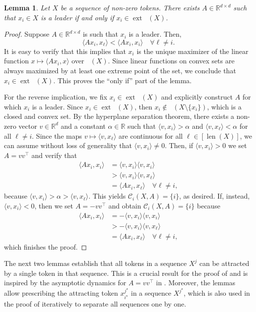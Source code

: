 \documentclass[pdflatex,sn-mathphys-num]{sn-jnl}%
\theoremstyle{thmstyleone}%
\newtheorem{lemma}[theorem]{Lemma}
\theoremstyle{thmstyletwo}%
\theoremstyle{thmstylethree}%
\numberwithin{equation}{section}
\newcommand{\R}{\mathbb{R}}
\DeclareMathOperator{\co}{\overline{co}}
\DeclareMathOperator{\ext}{ext}
\newcommand{\ip}[2]{\langle #1, #2 \rangle}
\DeclareMathOperator{\len}{len}
\begin{document}
\begin{lemma}\label{lem:howToLeader}
Let $X$ be a sequence of non-zero tokens. There exists $A\in \R^{d\times d}$ such that $x_i \in X$ is a leader if and only if $x_i \in \ext \co (X)$.
\end{lemma}
\begin{proof}
Suppose $A\in \R^{d\times d}$ is such that $x_i$ is a leader. Then,
\begin{equation}
    \langle A x_i, x_\ell \rangle < \langle A x_i, x_i\rangle \quad \forall \ell \neq i.
\end{equation}
It is easy to verify that this implies that $x_i$ is the unique maximizer of the linear function $x \mapsto \langle Ax_i, x\rangle$ over $\co(X)$. Since linear functions on convex sets are always maximized by at least one extreme point of the set, we conclude that $x_i \in \ext \co (X)$. This proves the ``only if'' part of the lemma.

For the reverse implication, we fix $x_i\in\ext\co (X)$ and explicitly construct $A$ for which $x_i$ is a leader. Since $x_i\in\ext\co (X)$, then $x_i\notin \co (X \setminus \{ x_i \})$, which is a closed and convex set. By the hyperplane separation theorem, there exists a non-zero vector $v\in \R^d$ and a constant $\alpha\in \R$ such that $\ip{v}{x_i} > \alpha$ and $\ip{v}{x_\ell} < \alpha$ for all $\ell\neq i$. Since the maps $v \mapsto \ip{v}{x_\ell}$ are continuous for all $\ell \in [\len (X)]$, we can assume without loss of generality that $\ip{v}{x_i} \neq 0$. 
Then, if $\ip{v}{x_i} > 0$ we set $A = vv^\top$ and verify that
\begin{equation}
    \begin{aligned}
    \langle A x_i, x_i\rangle &= \ip{v}{x_i} \ip{v}{x_i} \\
    &> \ip{v}{x_i}\ip{v}{x_\ell} \\
    &= \langle Ax_i, x_\ell\rangle \quad \forall \ell \neq i,
    \end{aligned}
\end{equation}
because $\ip{v}{x_i} > \alpha > \ip{v}{x_\ell}$. This yields $\mathcal{C}_i(X,A) = \{ i \}$, as desired. If, instead, $\ip{v}{x_i} < 0$, then we set $A = -vv^\top$ and obtain $\mathcal{C}_i(X,A) = \{ i \}$ because
\begin{align}
    \langle A x_i, x_i\rangle &= -\ip{v}{x_i} \ip{v}{x_i} \nonumber \\ 
    &> -\ip{v}{x_i}\ip{v}{x_\ell} \\
    &= \langle Ax_i, x_\ell\rangle \quad \forall \ell \neq i,
\end{align}
which finishes the proof.
\end{proof}
%
The next two lemmas establish that all tokens in a sequence $X^j$ can be attracted by a single token in that sequence. This is a crucial result for the proof of  and is inspired by the asymptotic dynamics for $A = v v^\top$ in . Moreover, the lemmas allow prescribing the attracting token $x_{i^\star}^{j^\star}$ in a sequence $X^{j^\star}$, which is also used in the proof of  iteratively to separate all sequences one by one.
\end{document}
